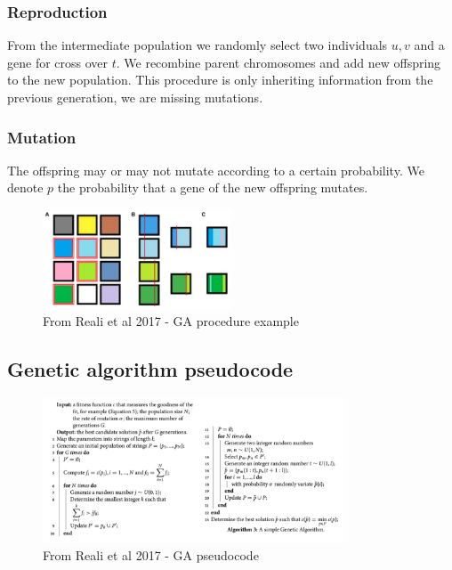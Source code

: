 \subsubsection{Reproduction}

From the intermediate population we randomly select two individuals
\(u,v\) and a gene for cross over \(t\). We recombine parent chromosomes
and add new offspring to the new population. This procedure is only
inheriting information from the previous generation, we are missing
mutations.

\subsubsection{Mutation}

The offspring may or may not mutate according to a certain probability.
We denote \(p\) the probability that a gene of the new offspring
mutates.

\begin{figure}
\centering
\includegraphics[width=0.5\textwidth]{ga_process.png}
\caption{From Reali et al 2017 - GA procedure example}
\end{figure}


\subsection{Genetic algorithm pseudocode}

\begin{figure}
\centering
\includegraphics[width=0.8\textwidth]{ga_algo.png}
\caption{From Reali et al 2017 - GA pseudocode}
\end{figure}

